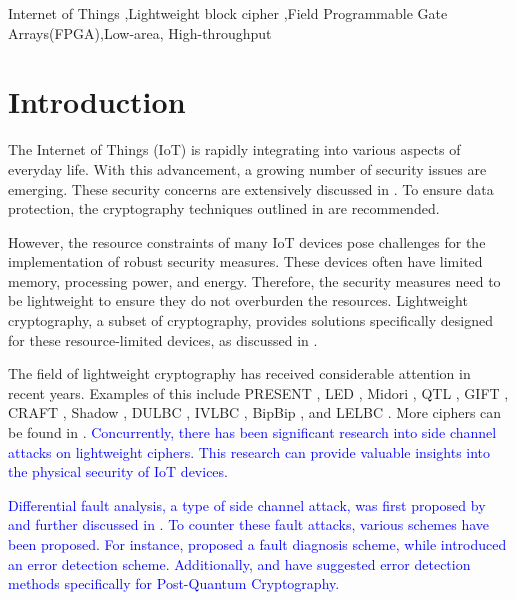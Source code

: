 \documentclass[final,5p,times,twocolumn]{elsarticle}
\begin{document}
\begin{frontmatter}
    \begin{keyword}
        Internet of Things  \sep Lightweight block cipher \sep Field Programmable Gate Arrays(FPGA)\sep  Low-area, High-throughput

    \end{keyword}

\end{frontmatter}




\section{Introduction}\label{sec1}

The Internet of Things (IoT) is rapidly integrating into various aspects of everyday life.
With this advancement, a growing number of security issues are emerging.
These security concerns are extensively discussed in \cite{Meneghello2019a}.
To ensure data protection, the cryptography techniques outlined in \cite{Swessi2022} are recommended.

However, the resource constraints of many IoT devices pose challenges for the implementation of robust security measures. These devices often have limited memory, processing power, and energy. Therefore, the security measures need to be lightweight to ensure they do not overburden the resources. Lightweight cryptography, a subset of cryptography, provides solutions specifically designed for these resource-limited devices, as discussed in \cite{Mohajerani2020}.

The field of lightweight cryptography has received considerable attention in recent years. Examples of this include PRESENT \cite{Bogdanov2007}, LED \cite{Guo2011}, Midori \cite{Banik2015a}, QTL \cite{Li2016}, GIFT \cite{Banik2017}, CRAFT \cite{Beierle2019}, Shadow \cite{Guo2021}, DULBC \cite{Yang2022}, IVLBC \cite{Huang2023}, BipBip \cite{Belkheyar2023}, and LELBC \cite{Song2024}. More ciphers can be found in \cite{Zakaria2023}. \textcolor{blue}{Concurrently, there has been significant research into side channel attacks on lightweight ciphers. This research can provide valuable insights into the physical security of IoT devices.}

\textcolor{blue}{Differential fault analysis, a type of side channel attack, was first proposed by \cite{Biham1997} and further discussed in \cite{Kermani}. To counter these fault attacks, various schemes have been proposed. For instance, \cite{Kermani2019} proposed a fault diagnosis scheme, while \cite{Kaur2024} introduced an error detection scheme. Additionally, \cite{CintasCanto2022} and \cite{Canto2023} have suggested error detection methods specifically for Post-Quantum Cryptography.}
\end{document}
